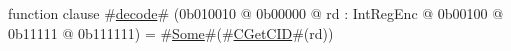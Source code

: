 function clause #\hyperref[zdecode]{decode}# (0b010010 @ 0b00000 @ rd : IntRegEnc @    0b00100 @    0b11111 @ 0b111111) = #\hyperref[zSome]{Some}#(#\hyperref[zCGetCID]{CGetCID}#(rd))
